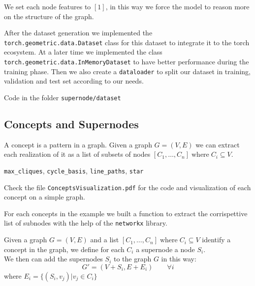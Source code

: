 \documentclass{article}
\begin{document}
    \begin{remark}
        We set each node features to \( [1] \), in this way we force the model to reason more on the structure of the graph.
    \end{remark}

    \noindent
    After the dataset generation we implemented the \texttt{torch.geometric.data.Dataset} class for this dataset to integrate it to the torch ecosystem. At a later time we implemented the class \texttt{torch.geometric.data.InMemoryDataset} to have better performance during the training phase. Then we also create a \texttt{dataloader} to split our dataset in training, validation and test set according to our needs.

    \begin{remark}
        Code in the folder \texttt{supernode/dataset}
    \end{remark}

    \subsection{Concepts and Supernodes}
    \begin{definition}[Concept]
        A concept is a pattern in a graph. Given a graph \( G = (V,E) \) we can extract each realization of it as a list of subsets of nodes \( [C_1, \ldots , C_n] \; \text{where} \; C_i \subseteq V \).
    \end{definition}
    \begin{eg}
        \texttt{max\_cliques}, \texttt{cycle\_basis}, \texttt{line\_paths}, \texttt{star}
    \end{eg}
    \begin{remark}
        Check the file \texttt{ConceptsVisualization.pdf} for the code and visualization of each concept on a simple graph.
    \end{remark}

    \noindent
    For each concepts in the example we built a function to extract the corrispettive list of subnodes with the help of the \texttt{networkx} library.

    \begin{definition}[Supernodes]
        Given a graph \( G = (V,E) \) and a list \( [C_1, \ldots , C_n] \; \text{where} \; C_i \subseteq V \) identify a concept in the graph, we define for each \( C_i \) a supernode a node \( S_i \).\\
        We then can add the supernodes \( S_i \) to the graph \( G \) in this way:\[
            G' = (V + S_i, E + E_i) \quad \quad  \forall i
        \]
        where \( E_i = \{(S_i, v_j) | v_j \in C_i\} \)

    \end{definition}
\end{document}
